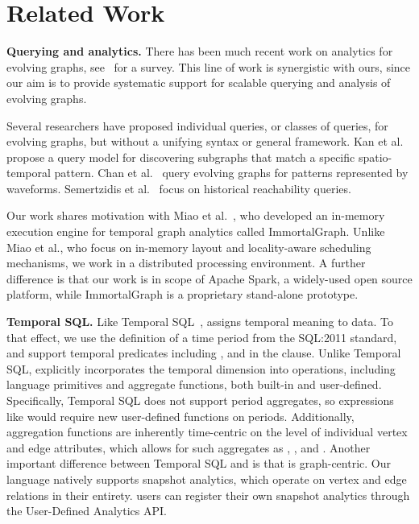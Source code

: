 \section{Related Work}
\label{sec:related}

{\bf Querying and analytics.} There has been much recent work on
analytics for evolving graphs,
see~\cite{DBLP:journals/csur/AggarwalS14} for a survey. This line of
work is synergistic with ours, since our aim is to provide systematic
support for scalable querying and analysis of evolving graphs.

Several researchers have proposed individual queries, or classes of
queries, for evolving graphs, but without a unifying syntax or general
framework.  Kan et al.~\cite{Kan2009} propose a query model for
discovering subgraphs that match a specific spatio-temporal pattern.
Chan et al.~\cite{Chan2008} query evolving graphs for patterns
represented by waveforms.  Semertzidis et al.~\cite{Semertzidis2015}
focus on historical reachability queries.

Our work shares motivation with Miao et
al.~\cite{DBLP:journals/tos/MiaoHLWYZPCC15}, who developed an
in-memory execution engine for temporal graph analytics called
ImmortalGraph.  Unlike Miao et al., who focus on in-memory layout and
locality-aware scheduling mechanisms, we work in a distributed
processing environment.  A further difference is that our work is in
scope of Apache Spark, a widely-used open source platform, while
ImmortalGraph is a proprietary stand-alone prototype.


{\bf Temporal SQL.}  Like Temporal
SQL~\cite{DBLP:journals/sigmod/KulkarniM12}, \ql assigns temporal
meaning to data.  To that effect, we use the definition of a time
period from the SQL:2011 standard, and support temporal predicates
including ,  and  in
the  clause.  Unlike Temporal SQL, \ql explicitly
incorporates the temporal dimension into operations, including
language primitives and aggregate functions, both built-in and
user-defined.  Specifically, Temporal SQL does not support period
aggregates, so expressions like  would
require new user-defined functions on periods. Additionally, \ql
aggregation functions are inherently time-centric on the level of
individual vertex and edge attributes, which allows for such
aggregates as , , and .  Another
important difference between Temporal SQL and \ql is that \ql is
graph-centric.  Our language natively supports snapshot analytics,
which operate on vertex and edge relations in their entirety.  \ql
users can register their own snapshot analytics through the
User-Defined Analytics API.

